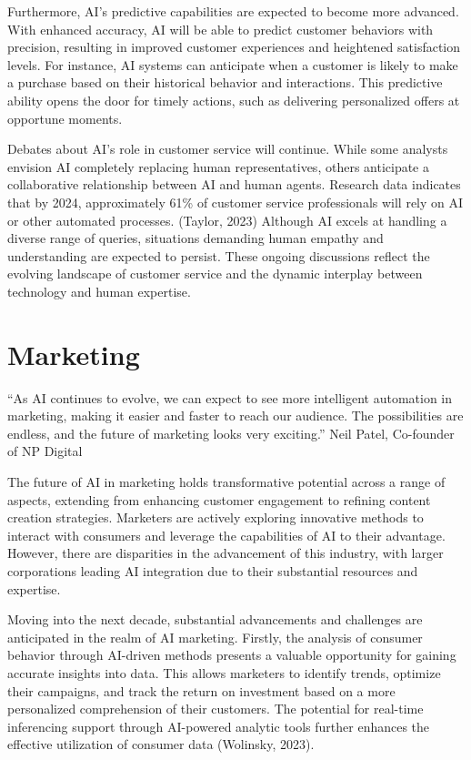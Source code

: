\documentclass[
]{book}
\begin{document}
Furthermore, AI's predictive capabilities are expected to become more advanced. With enhanced accuracy, AI will be able to predict customer behaviors with precision, resulting in improved customer experiences and heightened satisfaction levels. For instance, AI systems can anticipate when a customer is likely to make a purchase based on their historical behavior and interactions. This predictive ability opens the door for timely actions, such as delivering personalized offers at opportune moments.

Debates about AI's role in customer service will continue. While some analysts envision AI completely replacing human representatives, others anticipate a collaborative relationship between AI and human agents. Research data indicates that by 2024, approximately 61\% of customer service professionals will rely on AI or other automated processes. (Taylor, 2023) Although AI excels at handling a diverse range of queries, situations demanding human empathy and understanding are expected to persist. These ongoing discussions reflect the evolving landscape of customer service and the dynamic interplay between technology and human expertise.

\hypertarget{marketing}{%
\section{Marketing}\label{marketing}}

``As AI continues to evolve, we can expect to see more intelligent automation in marketing, making it easier and faster to reach our audience. The possibilities are endless, and the future of marketing looks very exciting.''
Neil Patel, Co-founder of NP Digital

The future of AI in marketing holds transformative potential across a range of aspects, extending from enhancing customer engagement to refining content creation strategies. Marketers are actively exploring innovative methods to interact with consumers and leverage the capabilities of AI to their advantage. However, there are disparities in the advancement of this industry, with larger corporations leading AI integration due to their substantial resources and expertise.

Moving into the next decade, substantial advancements and challenges are anticipated in the realm of AI marketing. Firstly, the analysis of consumer behavior through AI-driven methods presents a valuable opportunity for gaining accurate insights into data. This allows marketers to identify trends, optimize their campaigns, and track the return on investment based on a more personalized comprehension of their customers. The potential for real-time inferencing support through AI-powered analytic tools further enhances the effective utilization of consumer data (Wolinsky, 2023).
\end{document}
